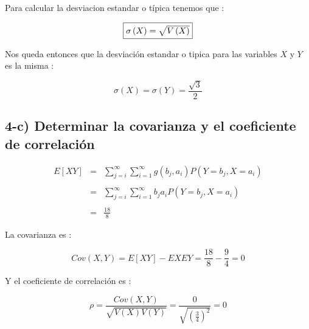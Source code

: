 \documentclass[12pt]{article}
\begin{document}
\begin{flushleft}
    Para calcular la desviacion estandar o t\'ipica tenemos que :
\end{flushleft}

\begin{equation*}
    \fbox{$\sigma \left(X\right) = \sqrt{V\left(X\right)} $}
\end{equation*}

\begin{flushleft}
    Nos queda entonces que la desviaci\'on estandar o tipica para las variables $X$ y $Y$
    es la misma :
\end{flushleft}

\begin{equation*}
    \displaystyle \sigma \left(X \right) = \sigma\left(Y\right)  = \frac{\sqrt{3}}{2}
\end{equation*}

\subsection*{4-c) Determinar la covarianza y el coeficiente de correlaci\'on }

    \begin{equation*}
        \begin{array}{rcl}
            E\left[XY\right]& = & \displaystyle \sum_{j=i}^{\infty}\sum_{i=1}^{\infty}g(b_j,a_i)P(Y=b_j,X=a_i)
            \\
            \\
            & = &\displaystyle \sum_{j=i}^{\infty}\sum_{i=1}^{\infty}b_ja_iP(Y=b_j,X=a_i)
            \\
            \\
            &=& \displaystyle \frac{18}{8}
        \end{array}
    \end{equation*}
    
    \begin{flushleft}
        La covarianza es : 
    \end{flushleft}
    \begin{equation*}
        Cov(X,Y)=E[XY]-EXEY=\frac{18}{8}-\frac{9}{4}=0
    \end{equation*}
   
    \begin{flushleft}
        Y el coeficiente de correlaci\'on  es : 
    \end{flushleft}

    \begin{equation*}
        \rho=\frac{Cov(X,Y)}{\sqrt{V(X)V(Y)}}=\frac{0}{\sqrt{\left(\frac{3}{4}\right)^2}}=0
    \end{equation*}
    
\end{document}
